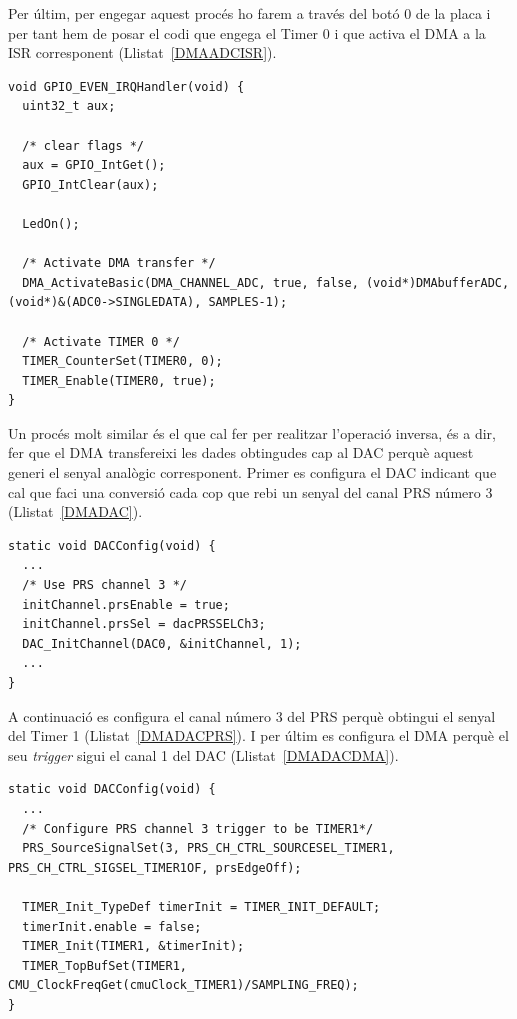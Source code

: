 Per últim, per engegar aquest procés ho farem a través del botó 0 de la placa i per tant hem de posar el codi que engega el Timer 0 i que activa el DMA a la ISR corresponent (Llistat~\ref{DMAADCISR}).

\begin{lstlisting}[style=customc,caption=Configuració del DMA per obtenir dades de l'ADC, label=DMAADCISR]
void GPIO_EVEN_IRQHandler(void) {
  uint32_t aux;

  /* clear flags */
  aux = GPIO_IntGet();
  GPIO_IntClear(aux);

  LedOn();

  /* Activate DMA transfer */
  DMA_ActivateBasic(DMA_CHANNEL_ADC, true, false, (void*)DMAbufferADC, (void*)&(ADC0->SINGLEDATA), SAMPLES-1);

  /* Activate TIMER 0 */
  TIMER_CounterSet(TIMER0, 0);
  TIMER_Enable(TIMER0, true);
}
\end{lstlisting}

Un procés molt similar és el que cal fer per realitzar l'operació inversa, és a dir, fer que el DMA transfereixi les dades obtingudes cap al DAC perquè aquest generi el senyal analògic corresponent. Primer es configura el DAC indicant que cal que faci una conversió cada cop que rebi un senyal del canal PRS número 3 (Llistat~\ref{DMADAC}).

\begin{lstlisting}[style=customc,caption=Configuració del DAC perquè funcioni amb el PRS, label=DMADAC]
static void DACConfig(void) {
  ...
  /* Use PRS channel 3 */
  initChannel.prsEnable = true;
  initChannel.prsSel = dacPRSSELCh3;
  DAC_InitChannel(DAC0, &initChannel, 1); 
  ...
}
\end{lstlisting}
A continuació es configura el canal número 3 del PRS perquè obtingui el senyal del Timer 1 (Llistat~\ref{DMADACPRS}). I per últim es configura el DMA perquè el seu {\em trigger} sigui el canal 1 del DAC (Llistat~\ref{DMADACDMA}).

\begin{lstlisting}[style=customc,caption=Configuració del PRS i el Timer, label=DMADACPRS]
static void DACConfig(void) {
  ...
  /* Configure PRS channel 3 trigger to be TIMER1*/
  PRS_SourceSignalSet(3, PRS_CH_CTRL_SOURCESEL_TIMER1, PRS_CH_CTRL_SIGSEL_TIMER1OF, prsEdgeOff);

  TIMER_Init_TypeDef timerInit = TIMER_INIT_DEFAULT;
  timerInit.enable = false;
  TIMER_Init(TIMER1, &timerInit);
  TIMER_TopBufSet(TIMER1, CMU_ClockFreqGet(cmuClock_TIMER1)/SAMPLING_FREQ);
}
\end{lstlisting}

